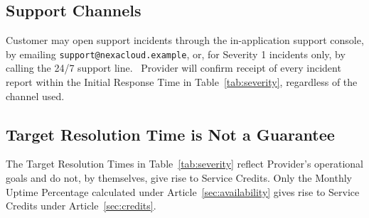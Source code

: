 \subsection{Support Channels}
Customer may open support incidents through the in-application support console, by emailing \texttt{support@nexacloud.example}, or, for Severity 1 incidents only, by calling the 24/7 support line. \faPhone\ Provider will confirm receipt of every incident report within the Initial Response Time in Table~\ref{tab:severity}, regardless of the channel used.

\subsection{Target Resolution Time is Not a Guarantee}
The Target Resolution Times in Table~\ref{tab:severity} reflect Provider's operational goals and do not, by themselves, give rise to Service Credits. Only the Monthly Uptime Percentage calculated under Article~\ref{sec:availability} gives rise to Service Credits under Article~\ref{sec:credits}.
